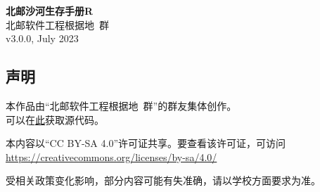 \documentclass[a4paper]{article}
\begin{document}


\begin{titlepage}
    \centering
    {\Huge\rmfamily\bfseries 北邮沙河生存手册R} \\[6.5ex]
    {\Large\sffamily 北邮软件工程根据地\ 群} \\
    {\large\ttfamily v3.0.0, July 2023}\\[1.5ex]
\end{titlepage}

\newpage
\begin{center}
\section*{声明}

本作品由“北邮软件工程根据地\ 群”的群友集体创作。\\
可以在\href{https://github.com/BUPTSE/welcome}{此}获取源代码。

\smallskip

本内容以“CC BY-SA 4.0”许可证共享。要查看该许可证，可访问\\
\href{https://creativecommons.org/licenses/by-sa/4.0/}{https://creativecommons.org/licenses/by-sa/4.0/}

\smallskip

受相关政策变化影响，部分内容可能有失准确，请以学校方面要求为准。

\bigskip

\end{center}

\newpage
\setcounter{page}{1}
\tableofcontents

\newpage
\setcounter{page}{1}

\pagestyle{fancy}
\lhead{\small \leftmark}
\chead{}
\lfoot{}
\cfoot{\thepage}
\rfoot{}
\renewcommand{\headrulewidth}{0.4pt}




















\end{document}
